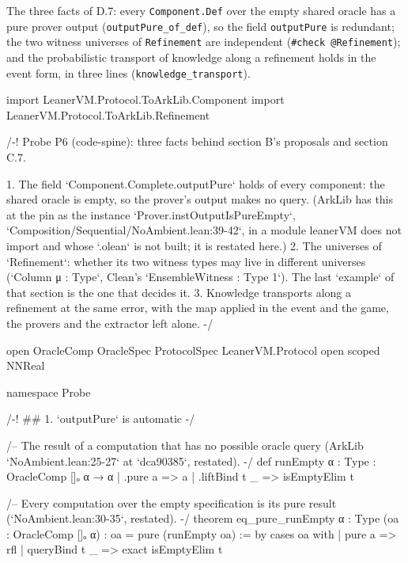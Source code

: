 The three facts of D.7: every \texttt{Component.\allowbreak{}Def} over the empty shared oracle has a pure prover output (\texttt{outputPure\_\allowbreak{}of\_\allowbreak{}def}), so the field \texttt{outputPure} is redundant; the two witness universes of \texttt{Refinement} are independent (\texttt{\#check @Refinement}); and the probabilistic transport of knowledge along a refinement holds in the event form, in three lines (\texttt{knowledge\_\allowbreak{}transport}).


\begin{leancode}
import LeanerVM.Protocol.ToArkLib.Component
import LeanerVM.Protocol.ToArkLib.Refinement

/-!
Probe P6 (code-spine): three facts behind section B's proposals and section C.7.

1. The field `Component.Complete.outputPure` holds of every component: the shared oracle is
   empty, so the prover's output makes no query. (ArkLib has this at the pin as the instance
   `Prover.instOutputIsPureEmpty`, `Composition/Sequential/NoAmbient.lean:39-42`, in a module
   leanerVM does not import and whose `.olean` is not built; it is restated here.)
2. The universes of `Refinement`: whether its two witness types may live in different
   universes (`Column μ : Type`, Clean's `EnsembleWitness : Type 1`). The last `example` of that
   section is the one that decides it.
3. Knowledge transports along a refinement at the same error, with the map applied in the
   event and the game, the provers and the extractor left alone.
-/

open OracleComp OracleSpec ProtocolSpec LeanerVM.Protocol
open scoped NNReal

namespace Probe

/-! ## 1. `outputPure` is automatic -/

/-- The result of a computation that has no possible oracle query (ArkLib
`NoAmbient.lean:25-27` at `dca90385`, restated). -/
def runEmpty {α : Type} : OracleComp []ₒ α → α
  | .pure a => a
  | .liftBind t _ => isEmptyElim t

/-- Every computation over the empty specification is its pure result (`NoAmbient.lean:30-35`,
restated). -/
theorem eq_pure_runEmpty {α : Type} (oa : OracleComp []ₒ α) : oa = pure (runEmpty oa) := by
  cases oa with
  | pure a => rfl
  | queryBind t _ => exact isEmptyElim t


\end{leancode}
